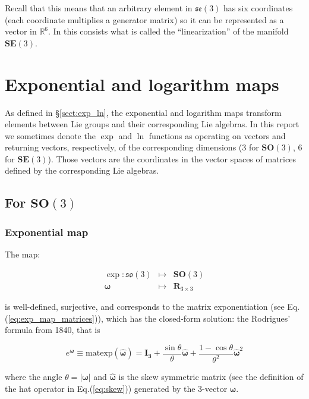 \documentclass[a4paper,11pt]{report}
\newcommand{\W}{{\bm{\omega}}}
\begin{document}
Recall that this means that an arbitrary element in $\mathfrak{se}(3)$
has six coordinates (each coordinate multiplies a generator matrix)
so it can be represented as a vector in $\mathbb{R}^6$.
In this consists what is called the ``linearization'' of the manifold
$\mathbf{SE}(3)$.


\section{Exponential and logarithm maps}

As defined in \S\ref{sect:exp_ln}, the exponential and logarithm maps
transform elements between Lie groups and their corresponding
Lie algebras.
In this report we sometimes denote the $\exp$ and $\ln$ functions
as operating on vectors and returning vectors, respectively,
of the corresponding dimensions (3 for $\mathbf{SO}(3)$, 6 for $\mathbf{SE}(3)$).
Those vectors are the coordinates in the
vector spaces of matrices defined by the corresponding Lie algebras.


\subsection{For $\mathbf{SO}(3)$}

\subsubsection{Exponential map}

The map:

\begin{eqnarray}
  \exp: \mathfrak{so}(3) & \mapsto & \mathbf{SO}(3) \\
           \W & \mapsto & \mathbf{R}_{3\times 3}
\end{eqnarray}

\noindent is well-defined, surjective, and
corresponds to the matrix exponentiation (see Eq.(\ref{eq:exp_map_matrices})),
which has the closed-form solution:
the  Rodrigues' formula from 1840, that is

\begin{equation}
\label{eq:rodrigues}
  e^ { \W } \equiv  \mathrm{matexp}(\hat{\W} ) =
\mathbf{I_3}
+ \frac{\sin \theta}{\theta} \hat{\W}
+ \frac{1- \cos \theta}{\theta^2} \hat{\W}^2
\end{equation}

\noindent where
the angle $\theta = |\W|$ and
$\hat{\W}$ is the skew symmetric matrix (see the definition of 
the hat operator in Eq.(\ref{eq:skew}))
generated by the 3-vector $\W$.
\end{document}
